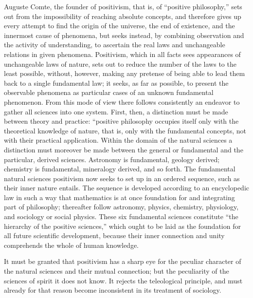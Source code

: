 \documentclass[12pt]{book}
\begin{document}
Auguste Comte, the founder of positivism, that is, of ``positive philosophy,''
sets out from the impossibility of reaching absolute concepts, and therefore
gives up every attempt to find the origin of the universe, the end of
existence, and the innermost cause of phenomena, but seeks instead, by combining
observation and the activity of understanding, to ascertain the real laws and
unchangeable relations in given phenomena. Positivism, which in all facts sees
appearances of unchangeable laws of nature, sets out to reduce the number of the
laws to the least possible, without, however, making any pretense of being able
to lead them back to a single fundamental law; it seeks, as far as possible, to
present the observable phenomena as particular cases of an unknown fundamental
phenomenon. From this mode of view there follows consistently an endeavor to
gather all sciences into one system. First, then, a distinction must be made
between theory and practice: ``positive philosophy occupies itself only with the
theoretical knowledge of nature, that is, only with the fundamental concepts, not
with their practical application. Within the domain of the natural sciences a
distinction must moreover be made between the general or fundamental and the
particular, derived sciences. Astronomy is fundamental, geology derived;
chemistry is fundamental, mineralogy derived, and so forth. The fundamental
natural sciences positivism now seeks to set up in an ordered sequence, such as
their inner nature entails. The sequence is developed according to an
encyclopedic law in such a way that mathematics is at once foundation for and
integrating part of philosophy; thereafter follow astronomy, physics, chemistry,
physiology, and sociology or social physics. These six fundamental sciences
constitute ``the hierarchy of the positive sciences,'' which ought to be laid as
the foundation for all future scientific development, because their inner
connection and unity comprehends the whole of human knowledge.

It must be granted that positivism has a sharp eye for the peculiar character of
the natural sciences and their mutual connection; but the peculiarity of the
sciences of spirit it does not know. It rejects the teleological principle, and
must already for that reason become inconsistent in its treatment of sociology.
\end{document}
